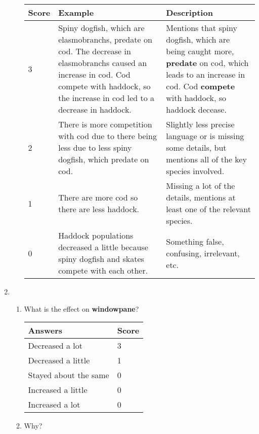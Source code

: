 \begin{enumerate}
\begin{enumerate}
\begin{tabular}{| l | p{5.25cm} | p{5.7cm} |} \hline
\rowcolor{violet!35} \textbf{Score} & \textbf{Example} & \textbf{Description} \\ \hline
3 & Spiny dogfish, which are elasmobranchs, predate on cod. The decrease in elasmobranchs caused an increase in cod. Cod compete with haddock, so the increase in cod led to a decrease in haddock. & Mentions that spiny dogfish, which are being caught more, \textbf{predate} on cod, which leads to an increase in cod.  Cod \textbf{compete} with haddock, so haddock decease. \\ 
2 & There is more competition with cod due to there being less due to less spiny dogfish, which predate on cod. & Slightly less precise language or is missing some details, but mentions all of the key species involved. \\ 
1 & There are more cod so there are less haddock. & Missing a lot of the details, mentions at least one of the relevant species. \\ 
0 & Haddock populations decreased a little because spiny dogfish and skates compete with each other. & Something false, confusing, irrelevant, etc. \\
\hline
\end{tabular}

\end{enumerate}

\item 
\begin{enumerate}
\item What is the effect on \textbf{windowpane}?

\begin{tabular}{| l | l |} \hline
\rowcolor{violet!35} \textbf{Answers} & \textbf{Score} \\ \hline
Decreased a lot & 3 \\ 
Decreased a little & 1 \\ 
Stayed about the same & 0 \\ 
Increased a little & 0 \\
Increased a lot & 0 \\
\hline
\end{tabular}

\item Why?


\end{enumerate}
\end{enumerate}

